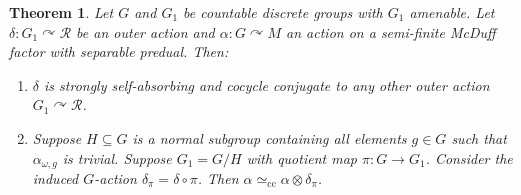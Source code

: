 \documentclass[11pt,a4paper]{article}
\newtheorem{theorem}{Theorem}
\theoremstyle{definition}
\theoremstyle{remark}
\numberwithin{equation}{section}
\numberwithin{theorem}{section}
\newcommand{\acts}{\curvearrowright}
\begin{document}
\begin{theorem} \label{theorem:model-absorption}
Let $G$ and $G_1$ be countable discrete groups with $G_1$ amenable.
Let $\delta: G_1\curvearrowright\mathcal R$ be an outer action and $\alpha\colon G \acts M$ an action on a semi-finite McDuff factor with separable predual.
Then:
\begin{enumerate}[label=\textup{(\roman*)},leftmargin=*]
\item $\delta$ is strongly self-absorbing and cocycle conjugate to any other outer action $G_1\curvearrowright\mathcal R$.\label{theorem:model-absorption:1}
\item Suppose $H\subseteq G$ is a normal subgroup containing all elements $g\in G$ such that $\alpha_{\omega,g}$ is trivial.
Suppose $G_1=G/H$ with quotient map $\pi: G\to G_1$. Consider the induced $G$-action $\delta_\pi = \delta \circ \pi$.
Then $\alpha \simeq_{\mathrm{cc}} \alpha \otimes \delta_\pi$. \label{theorem:model-absorption:2}
\end{enumerate}
\end{theorem}
\end{document}
